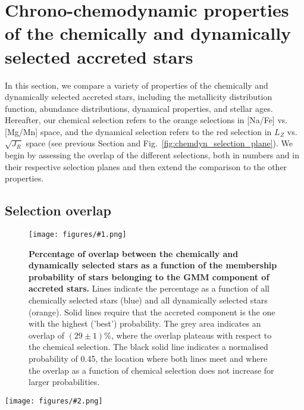 \documentclass[fleqn,usenatbib]{mnras}
\newcommand{\codeicon}{{\faCloudDownload}}
\newcommand{\codelink}[1]{\href{https://github.com/svenbuder/Accreted-stars-in-GALAH-DR3/tree/main/figures/#1.ipynb}{\codeicon}\,\,}
\newcommand{\oscaption}[2]{\caption{#2 \codelink{#1}}}
\newcommand{\figuretextwidth}[4]{\begin{figure*} \centering \texttt{[image: figures/\#2.png]}\oscaption{#3}{#4}\label{fig:#2} \end{figure*}}
\newcommand{\figurecolumnwidth}[3]{\begin{figure} \centering \texttt{[image: figures/\#1.png]}\oscaption{#2}{#3}\label{fig:#1} \end{figure}}
\begin{document}
\section{Chrono-chemodynamic properties of the chemically and dynamically selected accreted stars} \label{sec:chronochemodynamics}

In this section, we compare a variety of properties of the chemically and dynamically selected accreted stars, including the metallicity distribution function, abundance distributions, dynamical properties, and stellar ages. Hereafter, our chemical selection refers to the orange selections in [Na/Fe] vs. [Mg/Mn] space, and the dynamical selection refers to the red selection in $L_Z$ vs. $\sqrt{J_R}$ space (see previous Section and Fig.~\ref{fig:chemdyn_selection_plane}). We begin by assessing the overlap of the different selections, both in numbers and in their respective selection planes and then extend the comparison to the other properties.

\subsection{Selection overlap} \label{sec:overlap_planes}

\figurecolumnwidth{quantitative_overlap_chemdyn}{chronochemodynamic_comparison}{
\textbf{Percentage of overlap between the chemically and dynamically selected stars as a function of the membership probability of stars belonging to the GMM component of accreted stars.} Lines indicate the percentage as a function of all chemically selected stars (blue) and all dynamically selected stars (orange). Solid lines require that the accreted component is the one with the highest ('best') probability. The grey area indicates an overlap of $(29\pm1)\%$, where the overlap plateaus with respect to the chemical selection. The black solid line indicates a normalised probability of 0.45, the location where both lines meet and where the overlap as a function of chemical selection does not increase for larger probabilities.
}

\figuretextwidth{17cm}{chemdyn_selection_plane}{chronochemodynamic_comparison}{
\textbf{Comparison of chemical and dynamical selections in their respective planes, [Na/Fe] vs. [Mg/Mn] (top panels) and $L_Z$ vs. $\sqrt{J_R}$, respectively.}
\textbf{Left panels (a and d):} Chemical selection (orange).
\textbf{Middle panels (b and e):} Overlap of chemical and dynamical selection (purple).
\textbf{Right panels (c and f):} Dynamical selection (red).
Black background contours show the GALAH+ DR3 sample.
The red dashed box indicates the clean selection of GSE stars by \citet{Feuillet2021}.
}
\end{document}
